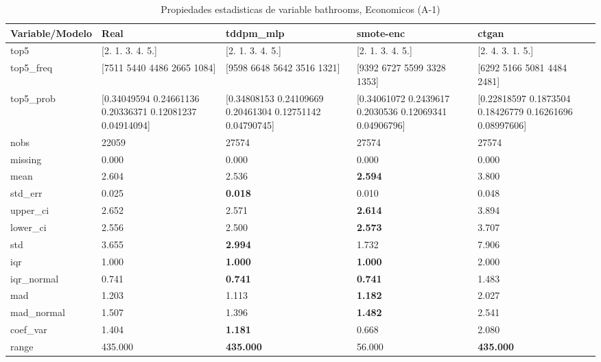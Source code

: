 \begin{table}[H]
\centering
\fontsize{8}{14}\selectfont
\caption{Propiedades  estadisticas de variable bathrooms, Economicos (A-1)}
\label{table-stats-economicos-a-1-bathrooms}
\begin{tabular}{|l|m{10em}|m{10em}|m{10em}|m{10em}|}
\hline
 \rowcolor[gray]{0.8}
Variable/Modelo & Real & tddpm\_mlp & smote-enc & ctgan \\
\hline top5 & [2. 1. 3. 4. 5.] & [2. 1. 3. 4. 5.] & [2. 1. 3. 4. 5.] & [2. 4. 3. 1. 5.] \\
\hline top5\_freq & [7511 5440 4486 2665 1084] & [9598 6648 5642 3516 1321] & [9392 6727 5599 3328 1353] & [6292 5166 5081 4484 2481] \\
\hline top5\_prob & [0.34049594 0.24661136 0.20336371 0.12081237 0.04914094] & [0.34808153 0.24109669 0.20461304 0.12751142 0.04790745] & [0.34061072 0.2439617  0.2030536  0.12069341 0.04906796] & [0.22818597 0.1873504  0.18426779 0.16261696 0.08997606] \\
\hline nobs & 22059 & 27574 & 27574 & 27574 \\
\hline missing & 0.000 & 0.000 & 0.000 & 0.000 \\
\hline mean & 2.604 & 2.536 & \bfseries 2.594 & \cellcolor[rgb]{0.9, 0.54, 0.52} 3.800 \\
\hline std\_err & 0.025 & \bfseries 0.018 & 0.010 & \cellcolor[rgb]{0.9, 0.54, 0.52} 0.048 \\
\hline upper\_ci & 2.652 & 2.571 & \bfseries 2.614 & \cellcolor[rgb]{0.9, 0.54, 0.52} 3.894 \\
\hline lower\_ci & 2.556 & 2.500 & \bfseries 2.573 & \cellcolor[rgb]{0.9, 0.54, 0.52} 3.707 \\
\hline std & 3.655 & \bfseries 2.994 & 1.732 & \cellcolor[rgb]{0.9, 0.54, 0.52} 7.906 \\
\hline iqr & 1.000 & \bfseries 1.000 & \bfseries 1.000 & \cellcolor[rgb]{0.9, 0.54, 0.52} 2.000 \\
\hline iqr\_normal & 0.741 & \bfseries 0.741 & \bfseries 0.741 & \cellcolor[rgb]{0.9, 0.54, 0.52} 1.483 \\
\hline mad & 1.203 & 1.113 & \bfseries 1.182 & \cellcolor[rgb]{0.9, 0.54, 0.52} 2.027 \\
\hline mad\_normal & 1.507 & 1.396 & \bfseries 1.482 & \cellcolor[rgb]{0.9, 0.54, 0.52} 2.541 \\
\hline coef\_var & 1.404 & \bfseries 1.181 & \cellcolor[rgb]{0.9, 0.54, 0.52} 0.668 & 2.080 \\
\hline range & 435.000 & \bfseries 435.000 & \cellcolor[rgb]{0.9, 0.54, 0.52} 56.000 & \bfseries 435.000 \\

\end{tabular}
\end{table}
